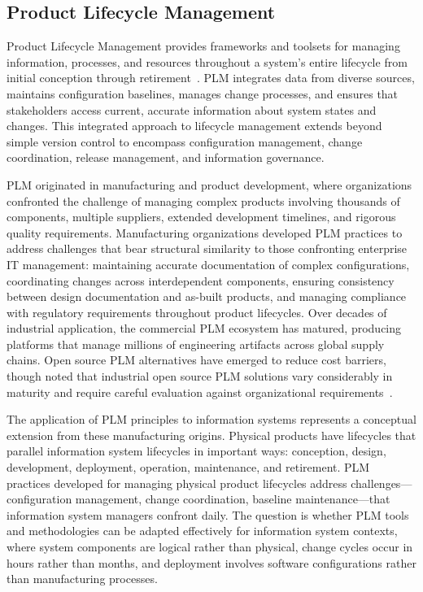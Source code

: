 \subsection{Product Lifecycle Management}

Product Lifecycle Management provides frameworks and toolsets for managing information, processes, and resources throughout a system's entire lifecycle from initial conception through retirement~\parencite{Ross_Winstead_McEvilley_2022}. PLM integrates data from diverse sources, maintains configuration baselines, manages change processes, and ensures that stakeholders access current, accurate information about system states and changes. This integrated approach to lifecycle management extends beyond simple version control to encompass configuration management, change coordination, release management, and information governance.

PLM originated in manufacturing and product development, where organizations confronted the challenge of managing complex products involving thousands of components, multiple suppliers, extended development timelines, and rigorous quality requirements. Manufacturing organizations developed PLM practices to address challenges that bear structural similarity to those confronting enterprise IT management: maintaining accurate documentation of complex configurations, coordinating changes across interdependent components, ensuring consistency between design documentation and as-built products, and managing compliance with regulatory requirements throughout product lifecycles. Over decades of industrial application, the commercial PLM ecosystem has matured, producing platforms that manage millions of engineering artifacts across global supply chains. Open source PLM alternatives have emerged to reduce cost barriers, though \citeauthor{Laili_2024} noted that industrial open source PLM solutions vary considerably in maturity and require careful evaluation against organizational requirements~\parencite{Laili_2024}.

The application of PLM principles to information systems represents a conceptual extension from these manufacturing origins. Physical products have lifecycles that parallel information system lifecycles in important ways: conception, design, development, deployment, operation, maintenance, and retirement. PLM practices developed for managing physical product lifecycles address challenges---configuration management, change coordination, baseline maintenance---that information system managers confront daily. The question is whether PLM tools and methodologies can be adapted effectively for information system contexts, where system components are logical rather than physical, change cycles occur in hours rather than months, and deployment involves software configurations rather than manufacturing processes.

